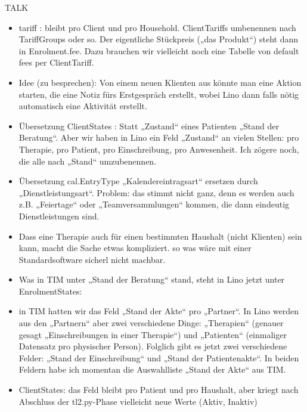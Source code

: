 \documentclass[letterpaper,10pt,ngerman]{sphinxmanual}
\begin{document}
TALK
\begin{itemize}
\item {} 
tariff : bleibt pro Client und pro Household. ClientTariffs
umbenennen nach TariffGroups oder so. Der eigentliche Stückpreis
(„das Produkt“) steht dann in Enrolment.fee. Dazu brauchen wir
vielleicht noch eine Tabelle von default fees per ClientTariff.

\item {} 
Idee (zu besprechen): Von einem neuen Klienten aus könnte man eine
Aktion starten, die eine Notiz fürs Erstgespräch erstellt, wobei
Lino dann falls nötig automatisch eine Aktivität erstellt.

\item {} 
Übersetzung ClientStates : Statt „Zustand“ eines Patienten „Stand
der Beratung“. Aber wir haben in Lino ein Feld „Zustand“ an vielen
Stellen: pro Therapie, pro Patient, pro Einschreibung, pro
Anwesenheit.  Ich zögere noch, die alle nach „Stand“ umzubenennen.

\item {} 
Übersetzung cal.EntryType „Kalendereintragsart“ ersetzen durch
„Dienstleistungsart“.  Problem: das stimmt nicht ganz, denn es
werden auch z.B. „Feiertage“ oder „Teamversammlungen“ kommen, die
dann eindeutig  Dienstleistungen sind.

\item {} 
Dass eine Therapie auch für einen bestimmten Haushalt (nicht
Klienten) sein kann, macht die Sache etwas kompliziert.  so was wäre
mit einer Standardsoftware sicherl nicht machbar.

\item {} 
Was in TIM unter „Stand der Beratung“ stand, steht in Lino jetzt
unter EnrolmentStates:

%
\begin{sphinxVerbatim}[commandchars=\\\{\}]
  
 
  
   
 
  
\end{sphinxVerbatim}

\item {} 
in TIM hatten wir das Feld „Stand der Akte“ pro „Partner“. In Lino
werden aus den „Partnern“ aber zwei verschiedene Dinge: „Therapien“
(genauer gesagt „Einschreibungen in einer Therapie“) und „Patienten“
(einmaliger Datensatz pro physischer Person). Folglich gibt es
jetzt zwei verschiedene Felder: „Stand der Einschreibung“ und „Stand
der Patientenakte“. In beiden Feldern habe ich momentan die
Auswahlliste „Stand der Akte“ aus TIM.

\item {} 
ClientStates: das Feld bleibt pro Patient und pro Haushalt, aber
kriegt nach Abschluss der tl2.py-Phase vielleicht neue Werte (Aktiv,
Inaktiv)

\end{itemize}
\end{document}
